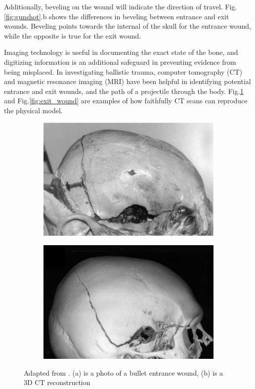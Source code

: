 \documentclass[titlepage]{article}
\begin{document}
Additionally, beveling on the wound will indicate the direction of travel. Fig.\ref{fig:gunshot}.b shows the differences in beveling between entrance and exit wounds. Beveling points towards the internal of the skull for the entrance wound, while the opposite is true for the exit wound.\cite{ballistic-trauma}

Imaging technology is useful in documenting the exact state of the bone, and digitizing information is an additional safeguard in preventing evidence from being misplaced. In investigating ballistic trauma, computer tomography (CT) and magnetic resonance imaging (MRI) have been helpful in identifying potential entrance and exit wounds, and the path of a projectile through the body. Fig.\ref{fig:entrance_wound} and Fig.\ref{fig:exit_wound} are examples of how faithfully CT scans can reproduce the physical model.

\begin{figure}[h!]
\centering
\begin{subfigure}{.5\textwidth}
  \centering
  \includegraphics[width=.7\linewidth]{entrance}
  \end{subfigure}%
\begin{subfigure}{.5\textwidth}
  \centering
  \includegraphics[width=.7\linewidth]{entrance_ct}
\end{subfigure}
\caption{Adapted from \cite{post-imaging}. (a) is a photo of a bullet entrance wound, (b) is a 3D CT reconstruction}
\label{fig:entrance_wound}
\end{figure}
\end{document}
